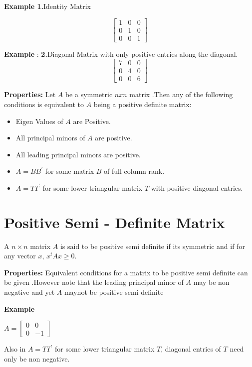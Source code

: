 {\bf Example 1.}Identity Matrix

\[
\begin{bmatrix}
1&0&0\\
0&1&0\\
0&0&1
\end{bmatrix}
\]

{\bf Example }:
 {\bf 2.}Diagonal Matrix with only positive entries along the diagonal.
\[
\begin{bmatrix}
7&0&0\\
0&4&0\\
0&0&6
\end{bmatrix}
\]

{\bf Properties:}
Let $A$ be a symmetric $nxn$ matrix .Then any of the following conditions is equivalent to $A$ being a positive definite matrix:
\begin{itemize}
\item Eigen Values of $A$ are Positive.
\item All principal minors of $A$ are positive.
\item All leading principal minors are positive.
\item $A = B B^{'}$ for some matrix $B$ of full column rank.
\item $A = T T^{'}$ for some lower triangular matrix $T$ with positive diagonal entries.
\end{itemize}      
     


\section{Positive Semi - Definite Matrix}

\begin{definition}
A $n\times n$  matrix $A$ is said to be positive semi definite if its symmetric and if for any  vector $x$, $ x^{t}Ax \geq 0$.
\end{definition}

{\bf Properties:}
Equivalent conditions for a matrix to be positive semi definite can be given .However note that the leading principal minor 
of $A$ may be non negative and yet $A$ maynot be positive semi definite 

{\bf Example}

$A=\begin{bmatrix}0&0\\0&-1\end{bmatrix}$
 
Also in $A = T T^{'}$ for some lower triangular matrix $T$, diagonal entries of $T$ need only be non negative.

